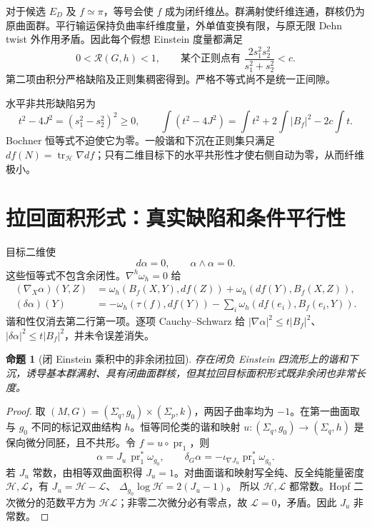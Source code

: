 \documentclass[UTF8,fontset=fandol,zihao=-4,oneside,openany]{ctexbook}
\theoremstyle{cjkplain}
\newtheorem{proposition}[theorem]{命题}
\numberwithin{equation}{chapter}
\begin{document}
对于候选 $E_D$ 及 $f\simeq\pi$，等号会使 $f$ 成为闭纤维丛。群满射使纤维连通，群核仍为原曲面群。平行输运保持负曲率纤维度量，外单值变换有限，与原无限 Dehn twist 外作用矛盾。因此每个假想 Einstein 度量都满足
\[
0<\mathcal R(G,h)<1,
\qquad
\text{某个正则点有 }\frac{2s_1^2s_2^2}{s_1^2+s_2^2}<c.
\]
第二项由积分严格缺陷及正则集稠密得到。严格不等式尚不是统一正间隙。

水平非共形缺陷另为
\begin{equation}\label{SUB:anisotropy}
t^2-4J^2=(s_1^2-s_2^2)^2\ge0,
\qquad
\int(t^2-4J^2)=\int t^2+2\int|B_f|^2-2c\int t.
\end{equation}
Bochner 恒等式不迫使它为零。一般谐和下沉在正则集只满足
$df(N)=\operatorname{tr}_{\mathcal H}\nabla df$；只有二维目标下的水平共形性才使右侧自动为零，从而纤维极小。

\section{拉回面积形式：真实缺陷和条件平行性}

目标二维使
\[
d\alpha=0,\qquad\alpha\wedge\alpha=0.
\]
这些恒等式不包含余闭性。$\nabla^h\omega_h=0$ 给
\begin{equation}\label{SUB:pullback-area-derivative}
\begin{aligned}
(\nabla_X\alpha)(Y,Z)
 &=\omega_h(B_f(X,Y),df(Z))+\omega_h(df(Y),B_f(X,Z)),\\
(\delta\alpha)(Y)
 &=-\omega_h(\tau(f),df(Y))
   -\sum_i\omega_h(df(e_i),B_f(e_i,Y)).
\end{aligned}
\end{equation}
谐和性仅消去第二行第一项。逐项 Cauchy--Schwarz 给
$|\nabla\alpha|^2\le t|B_f|^2$、$|\delta\alpha|^2\le t|B_f|^2$，并未令误差消失。

\begin{proposition}[闭 Einstein 乘积中的非余闭拉回]\label{SUB:area-counterexample}
存在闭负 Einstein 四流形上的谐和下沉，诱导基本群满射、具有闭曲面群核，但其拉回目标面积形式既非余闭也非常长度。
\end{proposition}
\begin{proof}
取 $(M,G)=(\Sigma_q,g_0)\times(\Sigma_p,k)$，两因子曲率均为 $-1$。在第一曲面取与 $g_0$ 不同的标记双曲结构 $h$。恒等同伦类的谐和映射
$u:(\Sigma_q,g_0)\to(\Sigma_q,h)$ 是保向微分同胚，且不共形。令
$f=u\circ\operatorname{pr}_1$，则
\[
\alpha=J_u\,\operatorname{pr}_1^*\omega_{g_0},\qquad
\delta_G\alpha=-\iota_{\nabla J_u}\operatorname{pr}_1^*\omega_{g_0}.
\]
若 $J_u$ 常数，由相等双曲面积得 $J_u=1$。对曲面谐和映射写全纯、反全纯能量密度 $\mathcal H,\mathcal L$，有
$J_u=\mathcal H-\mathcal L$、
$\Delta_{g_0}\log\mathcal H=2(J_u-1)$。
所以 $\mathcal H,\mathcal L$ 都常数。Hopf 二次微分的范数平方为
$\mathcal H\mathcal L$；非零二次微分必有零点，故 $\mathcal L=0$，矛盾。因此 $J_u$ 非常数。
\end{proof}
\end{document}
